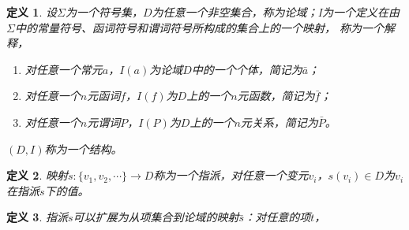 \documentclass{article}
\newtheorem{Def}{定义}
\begin{document}
\begin{CJK*}{UTF8}{gbsn}
\begin{Def}
  设$\Sigma$为一个符号集，$D$为任意一个非空集合，称为论域；I为一个定义在由$\Sigma$中的常量符号、函词符号和谓词符号所构成的集合上的一个映射，
  称为一个解释，
  \begin{enumerate}
    \item 对任意一个常元$a$，$I(a)$为论域$D$中的一个个体，简记为$\bar{a}$；
    \item 对任意一个$n$元函词$f$，$I(f)$为$D$上的一个$n$元函数，简记为$\bar{f}$；
    \item 对任意一个$n$元谓词$P$，$I(P)$为$D$上的一个$n$元关系，简记为$\bar{P}$。
  \end{enumerate}
  $(D,I)$称为一个结构。
\end{Def}
\begin{Def}
  映射$s:\{v_1,v_2,\cdots\}\to D$称为一个指派，对任意一个变元$v_i$，$s(v_i)\in D$为$v_i$在指派$s$下的值。
\end{Def}
\begin{Def}
  指派$s$可以扩展为从项集合到论域的映射$\bar{s}$：对任意的项$t$，


\end{Def}
\end{CJK*}
\end{document}
